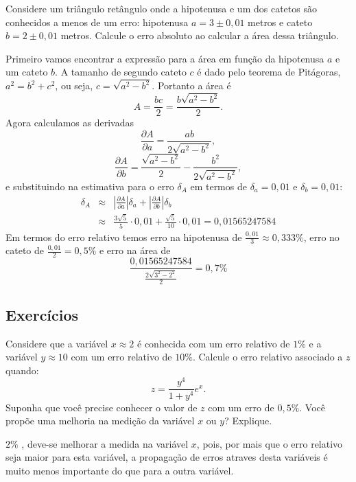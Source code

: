 \begin{ex}
Considere um triângulo retângulo onde a hipotenusa e um dos catetos são conhecidos a menos de um erro: hipotenusa $a=3\pm 0,01$ metros e cateto $b=2\pm 0,01$ metros. Calcule o erro absoluto ao calcular a área dessa triângulo.
\end{ex}
\begin{sol}
Primeiro vamos encontrar a expressão para a área em função da hipotenusa $a$ e um cateto $b$. A tamanho de segundo cateto $c$ é dado pelo teorema de Pitágoras, $a^2=b^2+c^2$, ou seja, $c=\sqrt{a^2-b^2}$. Portanto a área é $$
A=\frac{bc}{2}=\frac{b\sqrt{a^2-b^2}}{2}.
$$
Agora calculamos as derivadas
$$
\frac{\partial A}{\partial a}=\frac{ab}{2\sqrt{a^2-b^2}},
$$
$$
\frac{\partial A}{\partial b}=\frac{\sqrt{a^2-b^2}}{2}-\frac{b^2}{2\sqrt{a^2-b^2}},
$$
e substituindo na estimativa para o erro $\delta_A$ em termos de $\delta_a=0,01$ e $\delta_b=0,01$:
\begin{eqnarray*}
\delta_A&\approx & \left|\frac{\partial A}{\partial a}\right|\delta_a+\left|\frac{\partial A}{\partial b}\right|\delta_b\\
&\approx &\frac{3\sqrt{5}}{5}\cdot 0,01+\frac{\sqrt{5}}{10}\cdot 0,01=0,01565247584
\end{eqnarray*}
Em termos do erro relativo temos erro na hipotenusa de $\frac{0,01}{3}\approx 0,333\%$, erro no cateto de $\frac{0,01}{2}= 0,5\%$ e erro na área de
$$
\frac{0,01565247584}{\frac{2\sqrt{3^2-2^2}}{2}}=0,7\%
$$
\end{sol}

\subsection*{Exercícios}

\begin{exer}Considere que a variável $x\approx 2$ é conhecida com um erro relativo de $1\%$ e a variável $y\approx 10$ com um erro relativo de $10\%$. Calcule o erro relativo associado a $z$ quando:
  \begin{equation*}
    z=\frac{y^4}{1+y^4}e^x.  
  \end{equation*}
Suponha que você precise conhecer o valor de $z$ com um erro de $0,5\%$. Você propõe uma melhoria na medição da variável $x$ ou $y$? Explique.
\end{exer}
\begin{resp}
  
    $2\%$  , deve-se melhorar a medida na variável $x$, pois, por mais que o erro relativo seja maior para esta variável, a propagação de erros atraves desta variáveis é muito menos importante do que para a outra variável.  
  
\end{resp}

